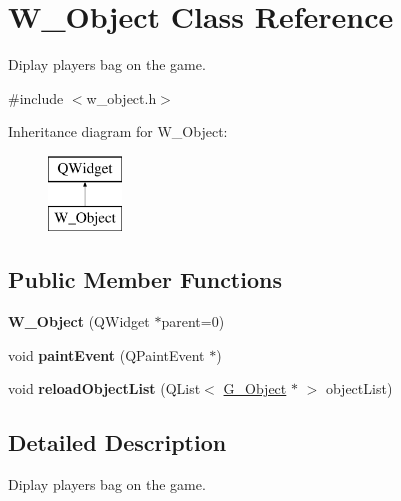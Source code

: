 \hypertarget{class_w___object}{}\section{W\+\_\+\+Object Class Reference}
\label{class_w___object}


Diplay player\textquotesingle{}s bag on the game.  




{\ttfamily \#include $<$w\+\_\+object.\+h$>$}

Inheritance diagram for W\+\_\+\+Object\+:\begin{figure}[H]
\begin{center}
\leavevmode
\includegraphics[height=2.000000cm]{class_w___object}
\end{center}
\end{figure}
\subsection*{Public Member Functions}
\begin{DoxyCompactItemize}
\item 
\hypertarget{class_w___object_a0b72570f71d65c67ca649cc76c3077cf}{}{\bfseries W\+\_\+\+Object} (Q\+Widget $\ast$parent=0)\label{class_w___object_a0b72570f71d65c67ca649cc76c3077cf}

\item 
\hypertarget{class_w___object_ab0e3dcaabbbcfeab50b4a449e667b56d}{}void {\bfseries paint\+Event} (Q\+Paint\+Event $\ast$)\label{class_w___object_ab0e3dcaabbbcfeab50b4a449e667b56d}

\item 
\hypertarget{class_w___object_a7ac4e7ab3ebae9f9d0c4845dc75d0204}{}void {\bfseries reload\+Object\+List} (Q\+List$<$ \hyperlink{class_g___object}{G\+\_\+\+Object} $\ast$ $>$ object\+List)\label{class_w___object_a7ac4e7ab3ebae9f9d0c4845dc75d0204}

\end{DoxyCompactItemize}


\subsection{Detailed Description}
Diplay player\textquotesingle{}s bag on the game. 

